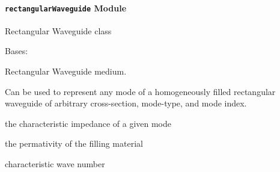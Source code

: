 \documentclass[letterpaper,10pt,english]{sphinxmanual}
\begin{document}
\paragraph{\texttt{rectangularWaveguide} Module}
\label{api/mwavepy.media:module-mwavepy.media.rectangularWaveguide}\label{api/mwavepy.media:rectangularwaveguide-module}
Rectangular Waveguide class

\begin{fulllineitems}
\label{api/mwavepy.media:mwavepy.media.rectangularWaveguide.RectangularWaveguide}
Bases: {\hyperref[api/mwavepy.media:mwavepy.media.media.Media]{}}

Rectangular Waveguide medium.

Can be used to represent any mode of a homogeneously filled     
rectangular waveguide of arbitrary cross-section, mode-type, and
mode index.

\begin{fulllineitems}
\label{api/mwavepy.media:mwavepy.media.rectangularWaveguide.RectangularWaveguide.Z0}
the characteristic impedance of a given mode

\end{fulllineitems}


\begin{fulllineitems}
\label{api/mwavepy.media:mwavepy.media.rectangularWaveguide.RectangularWaveguide.ep}
the permativity of the filling material

\end{fulllineitems}


\begin{fulllineitems}
\label{api/mwavepy.media:mwavepy.media.rectangularWaveguide.RectangularWaveguide.k0}
characteristic wave number


\end{fulllineitems}
\end{fulllineitems}
\end{document}
